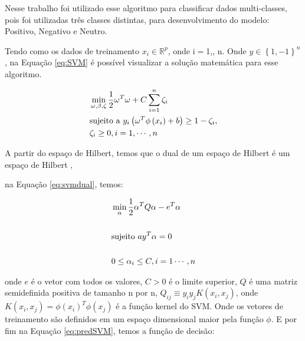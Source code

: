 
        Nesse trabalho foi utilizado esse algoritmo para classificar dados multi-classes, pois foi utilizadas três classes distintas, para
        desenvolvimento do modelo: Positivo, Negativo e Neutro. 
        
        Tendo como os dados de treinamento $x_{i} \in \mathbb{R}^{p}$, onde i$=$1,\cdots, n. Onde $ y \in \left \{ 1,-1 \right \}^{n}$, na Equação \ref{eq:SVM} é
        possível visualizar a solução matemática para esse algoritmo.

        \begin{equation}\label{eq:SVM}
          \begin{aligned}
            & \min_{\omega,\beta, \zeta } \frac{1}{2}\omega^{T}\omega + C \sum_{i=1}^{n}\zeta_{i}\\
            & \textup{sujeito a } y_{i}\left ( \omega^{T}\phi \left ( x_{i} \right ) +b \right )\geq 1 - \zeta_{i},\\
            & \zeta_{i}\geq 0, i = 1,\cdots, n
        \end{aligned}
        \end{equation}

        A partir do espaço de Hilbert, temos que o dual de um espaço de Hilbert é um espaço de Hilbert \cite{lorena2007introduccao}, 
        
        na Equação \ref{eq:svmdual}, temos:

        \begin{equation}\label{eq:svmdual}
          \begin{aligned}
            & \min_{\alpha} \frac{1}{2}\alpha^{T}Q\alpha - e^{T}\alpha\\ \\
            & \textup{sujeito } a y^{T}\alpha = 0 \\ \\
            & 0\leq \alpha_{i}\leq C, i= 1\cdots, n 
        \end{aligned}
        \end{equation}

        onde $e$ é o vetor com todos os valores, $C>0$ é o limite superior, $Q$ é uma matriz semidefinida positiva de tamanho n por n,
        $Q_{ij}\equiv y_{i}y_{j}K(x_{i},x_{j})$, onde $K(x_{i},x_{j}) = \phi(x_{i})^{T}\phi(x_{j})$ é a função kernel do \acrshort{SVM}. Onde os 
        vetores de treinamento são definidos em um espaço dimensional maior pela função $\phi$.
         E por fim na Equação \ref{eq:predSVM}, temos a função de decisão:

